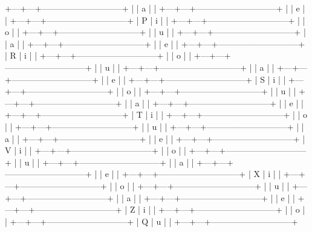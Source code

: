 +---+---+-----------------------------+
|   | a |                             |
+---+---+-----------------------------+
|   | e |                             |
+---+---+-----------------------------+
| P | i |                             |
+---+---+-----------------------------+
|   | o |                             |
+---+---+-----------------------------+
|   | u |                             |
+---+---+-----------------------------+
|   | a |                             |
+---+---+-----------------------------+
|   | e |                             |
+---+---+-----------------------------+
| R | i |                             |
+---+---+-----------------------------+
|   | o |                             |
+---+---+-----------------------------+
|   | u |                             |
+---+---+-----------------------------+
|   | a |                             |
+---+---+-----------------------------+
|   | e |                             |
+---+---+-----------------------------+
| S | i |                             |
+---+---+-----------------------------+
|   | o |                             |
+---+---+-----------------------------+
|   | u |                             |
+---+---+-----------------------------+
|   | a |                             |
+---+---+-----------------------------+
|   | e |                             |
+---+---+-----------------------------+
| T | i |                             |
+---+---+-----------------------------+
|   | o |                             |
+---+---+-----------------------------+
|   | u |                             |
+---+---+-----------------------------+
|   | a |                             |
+---+---+-----------------------------+
|   | e |                             |
+---+---+-----------------------------+
| V | i |                             |
+---+---+-----------------------------+
|   | o |                             |
+---+---+-----------------------------+
|   | u |                             |
+---+---+-----------------------------+
|   | a |                             |
+---+---+-----------------------------+
|   | e |                             |
+---+---+-----------------------------+
| X | i |                             |
+---+---+-----------------------------+
|   | o |                             |
+---+---+-----------------------------+
|   | u |                             |
+---+---+-----------------------------+
|   | a |                             |
+---+---+-----------------------------+
|   | e |                             |
+---+---+-----------------------------+
| Z | i |                             |
+---+---+-----------------------------+
|   | o |                             |
+---+---+-----------------------------+
| Q | u |                             |
+---+---+-----------------------------+
